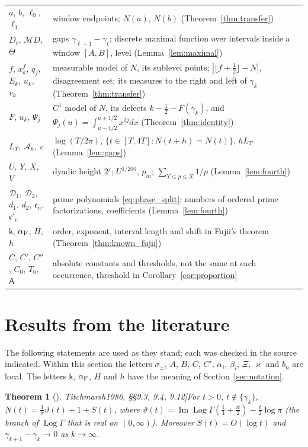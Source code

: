 \documentclass[11pt,a4paper]{article}
\makeatletter
\numberwithin{equation}{section}
\DeclareRobustCommand{\CGref}[1]{\ref{#1}}
\DeclareRobustCommand{\CGeqref}[1]{\eqref{#1}}
\DeclareRobustCommand{\CGcite}[2][]{\if\relax\detokenize{#1}\relax\cite{#2}\else\cite[#1]{#2}\fi}
\let\CG@origref\ref
\let\CG@origeqref\eqref
\newcommand{\CG@gettip}[1]{\@ifundefined{CGTip@#1}{#1}{\csname CGTip@#1\endcsname}}
\newcommand{\CG@getbib}[1]{\@ifundefined{CGBib@#1}{#1}{\csname CGBib@#1\endcsname}}
\DeclareRobustCommand{\CGref}[1]{\pdftooltip{\CG@origref{#1}}{\CG@gettip{#1}}}
\DeclareRobustCommand{\CGeqref}[1]{\pdftooltip{\CG@origeqref{#1}}{\CG@gettip{#1}}}
\DeclareRobustCommand{\CGcite}[2][]{\pdftooltip{\if\relax\detokenize{#1}\relax\cite{#2}\else\cite[#1]{#2}\fi}{\CG@getbib{#2}}}
\newtheorem{theorem}{Theorem}[section]
\theoremstyle{definition}
\theoremstyle{remark}
\newcommand{\M}{\mathcal M}
\makeatother
\begin{document}
\begin{center}
\begin{longtable}{p{}p{}}
$a$, $b$, $\ell_0$, $\ell_1$ & window endpoints; $N(a)$, $N(b)$ (Theorem~\CGref{thm:transfer})\\
$D_\ell$, $\M D$, $\Theta$ & gaps $\gamma_{\ell+1}-\gamma_\ell$; discrete maximal function over intervals inside a window $[A,B]$, level (Lemma~\CGref{lem:maximal})\\
$f$, $x^f_k$, $q_f$, $E_k$, $u_k$, $v_k$ & measurable model of $N$, its sublevel points; $|\lfloor f+\frac12\rfloor-N|$, disagreement set; its measures to the right and left of $\gamma_k$ (Theorem~\CGref{thm:transfer})\\
$F$, $u_k$, $\Psi_j$ & $C^1$ model of $N$, its defects $k-\frac12-F(\gamma_k)$, and $\Psi_j(u)=\int_{u-1/2}^{u+1/2}x^{2j}dx$ (Theorem~\CGref{thm:identity})\\
$L_T$, $\mathcal A_h$, $v$ & $\log(T/2\pi)$, $\{t\in[T,4T]:N(t+h)=N(t)\}$, $hL_T$ (Lemma~\CGref{lem:gaps})\\
$U$, $Y$, $X$, $V$ & dyadic height $2^j$; $U^{1/200}$, $p_m$; $\sum_{Y\le p\le X}1/p$ (Lemma~\CGref{lem:fourth})\\
$\mathscr D_1$, $\mathscr D_2$, $d_1$, $d_2$, $\mathfrak c_n$, $\mathfrak c'_v$ & prime polynomials \CGeqref{eq:phase_split}; numbers of ordered prime factorizations, coefficients (Lemma~\CGref{lem:fourth})\\
$\mathsf k$, $\alpha_{\rm F}$, $H$, $h$ & order, exponent, interval length and shift in Fujii's theorem (Theorem~\CGref{thm:known_fujii})\\
$C$, $C'$, $C''$, $C_0$, $T_0$, $\mathsf A$ & absolute constants and thresholds, not the same at each occurrence, threshold in Corollary~\CGref{cor:proportion}\\
\end{longtable}
\end{center}

\section{Results from the literature}\label{sec:external}

The following statements are used as they stand; each was checked in the source indicated. Within this section the letters $\sigma_\pm$, $A$, $B$, $C$, $C'$, $\alpha_i$, $\beta_i$, $\Xi$, $\varkappa$ and $b_n$ are local. The letters $\mathsf k$, $\alpha_{\rm F}$, $H$ and $h$ have the meaning of Section~\CGref{sec:notation}.

\begin{theorem}[\CGcite{Titchmarsh1986}, \S\S9.3, 9.4, 9.12]\label{thm:known_basic}
For $t>0$, $t\notin\{\gamma_k\}$, $N(t)=\frac1\pi\vartheta(t)+1+S(t)$, where $\vartheta(t)=\operatorname{Im}\operatorname{Log}\Gamma(\frac14+\frac{it}2)-\frac t2\log\pi$ (the branch of $\operatorname{Log}\Gamma$ that is real on $(0,\infty)$). Moreover $S(t)=O(\log t)$ and $\gamma_{k+1}-\gamma_k\to0$ as $k\to\infty$.
\end{theorem}
\end{document}
